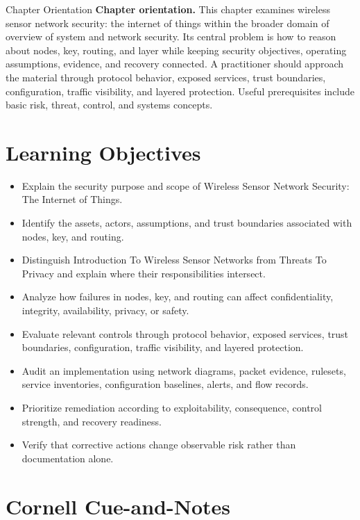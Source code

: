 \documentclass[11pt,letterpaper]{article}
\title{\CornellDocumentTitle}
\author{}
\date{}
\begin{document}
\maketitle
\begin{CornellOverviewBox}{Chapter Orientation}
\textbf{Chapter orientation.} This chapter examines wireless sensor network security: the internet of things within the broader domain of overview of system and network security. Its central problem is how to reason about nodes, key, routing, and layer while keeping security objectives, operating assumptions, evidence, and recovery connected. A practitioner should approach the material through protocol behavior, exposed services, trust boundaries, configuration, traffic visibility, and layered protection. Useful prerequisites include basic risk, threat, control, and systems concepts.
\end{CornellOverviewBox}
\section*{Learning Objectives}
\begin{itemize}
\item Explain the security purpose and scope of Wireless Sensor Network Security: The Internet of Things.
\item Identify the assets, actors, assumptions, and trust boundaries associated with nodes, key, and routing.
\item Distinguish Introduction To Wireless Sensor Networks from Threats To Privacy and explain where their responsibilities intersect.
\item Analyze how failures in nodes, key, and routing can affect confidentiality, integrity, availability, privacy, or safety.
\item Evaluate relevant controls through protocol behavior, exposed services, trust boundaries, configuration, traffic visibility, and layered protection.
\item Audit an implementation using network diagrams, packet evidence, rulesets, service inventories, configuration baselines, alerts, and flow records.
\item Prioritize remediation according to exploitability, consequence, control strength, and recovery readiness.
\item Verify that corrective actions change observable risk rather than documentation alone.
\end{itemize}
\section*{Cornell Cue-and-Notes}
\end{document}
